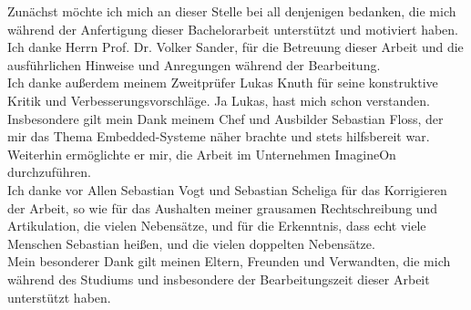 Zunächst möchte ich mich an dieser Stelle bei all denjenigen bedanken, die mich während der Anfertigung dieser
Bachelorarbeit unterstützt und motiviert haben.\\

Ich danke Herrn Prof. Dr. Volker Sander, für die Betreuung dieser Arbeit und die ausführlichen Hinweise und Anregungen
während der Bearbeitung.\\

Ich danke außerdem meinem Zweitprüfer Lukas Knuth für seine konstruktive Kritik und Verbesserungsvorschläge.
Ja Lukas, hast mich schon verstanden.\\

Insbesondere gilt mein Dank meinem Chef und Ausbilder Sebastian Floss, der mir das Thema Embedded-Systeme näher brachte
und stets hilfsbereit war.
Weiterhin ermöglichte er mir, die Arbeit im Unternehmen ImagineOn durchzuführen.\\

Ich danke vor Allen Sebastian Vogt und Sebastian Scheliga für das Korrigieren der Arbeit, so wie für das Aushalten meiner
grausamen Rechtschreibung und Artikulation, die vielen Nebensätze, und für die Erkenntnis, dass echt viele Menschen
Sebastian heißen, und die vielen doppelten Nebensätze.\\

Mein besonderer Dank gilt meinen Eltern, Freunden und Verwandten, die mich während des Studiums und insbesondere der
Bearbeitungszeit dieser Arbeit unterstützt haben.